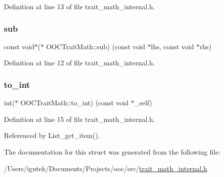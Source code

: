 Definition at line 13 of file trait\+\_\+math\+\_\+internal.\+h.

\mbox{\label{structOOCTraitMath_af9091282b3de5e335a75e51e54240ec5}} 
\subsubsection{\texorpdfstring{sub}{sub}}
{\footnotesize\ttfamily const void$\ast$($\ast$ O\+O\+C\+Trait\+Math\+::sub) (const void $\ast$lhs, const void $\ast$rhs)}



Definition at line 12 of file trait\+\_\+math\+\_\+internal.\+h.

\mbox{\label{structOOCTraitMath_adb6702c7794b114f252fba89f58342cc}} 
\subsubsection{\texorpdfstring{to\+\_\+int}{to\_int}}
{\footnotesize\ttfamily int($\ast$ O\+O\+C\+Trait\+Math\+::to\+\_\+int) (const void $\ast$\+\_\+self)}



Definition at line 15 of file trait\+\_\+math\+\_\+internal.\+h.



Referenced by List\+\_\+get\+\_\+item().



The documentation for this struct was generated from the following file\+:\begin{DoxyCompactItemize}
\item 
/\+Users/igutek/\+Documents/\+Projects/ooc/src/\mbox{\hyperlink{trait__math__internal_8h}{trait\+\_\+math\+\_\+internal.\+h}}\end{DoxyCompactItemize}
